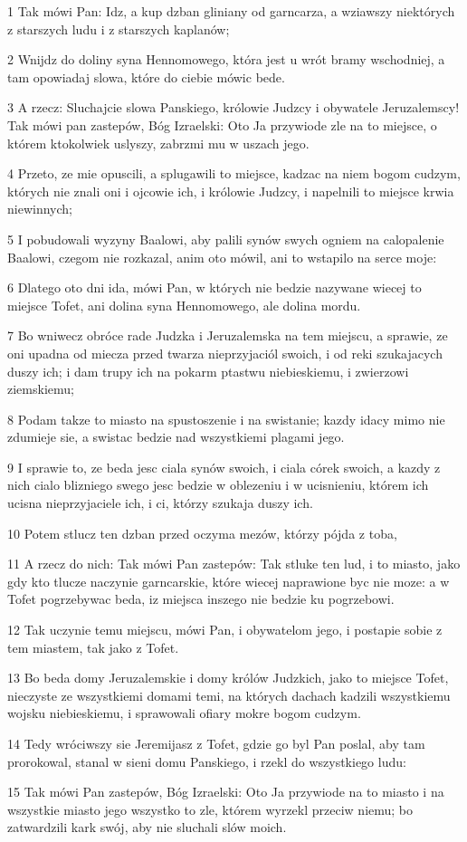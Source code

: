 \par 1 Tak mówi Pan: Idz, a kup dzban gliniany od garncarza, a wziawszy niektórych z starszych ludu i z starszych kaplanów;
\par 2 Wnijdz do doliny syna Hennomowego, która jest u wrót bramy wschodniej, a tam opowiadaj slowa, które do ciebie mówic bede.
\par 3 A rzecz: Sluchajcie slowa Panskiego, królowie Judzcy i obywatele Jeruzalemscy! Tak mówi pan zastepów, Bóg Izraelski: Oto Ja przywiode zle na to miejsce, o którem ktokolwiek uslyszy, zabrzmi mu w uszach jego.
\par 4 Przeto, ze mie opuscili, a splugawili to miejsce, kadzac na niem bogom cudzym, których nie znali oni i ojcowie ich, i królowie Judzcy, i napelnili to miejsce krwia niewinnych;
\par 5 I pobudowali wyzyny Baalowi, aby palili synów swych ogniem na calopalenie Baalowi, czegom nie rozkazal, anim oto mówil, ani to wstapilo na serce moje:
\par 6 Dlatego oto dni ida, mówi Pan, w których nie bedzie nazywane wiecej to miejsce Tofet, ani dolina syna Hennomowego, ale dolina mordu.
\par 7 Bo wniwecz obróce rade Judzka i Jeruzalemska na tem miejscu, a sprawie, ze oni upadna od miecza przed twarza nieprzyjaciól swoich, i od reki szukajacych duszy ich; i dam trupy ich na pokarm ptastwu niebieskiemu, i zwierzowi ziemskiemu;
\par 8 Podam takze to miasto na spustoszenie i na swistanie; kazdy idacy mimo nie zdumieje sie, a swistac bedzie nad wszystkiemi plagami jego.
\par 9 I sprawie to, ze beda jesc ciala synów swoich, i ciala córek swoich, a kazdy z nich cialo blizniego swego jesc bedzie w oblezeniu i w ucisnieniu, którem ich ucisna nieprzyjaciele ich, i ci, którzy szukaja duszy ich.
\par 10 Potem stlucz ten dzban przed oczyma mezów, którzy pójda z toba,
\par 11 A rzecz do nich: Tak mówi Pan zastepów: Tak stluke ten lud, i to miasto, jako gdy kto tlucze naczynie garncarskie, które wiecej naprawione byc nie moze: a w Tofet pogrzebywac beda, iz miejsca inszego nie bedzie ku pogrzebowi.
\par 12 Tak uczynie temu miejscu, mówi Pan, i obywatelom jego, i postapie sobie z tem miastem, tak jako z Tofet.
\par 13 Bo beda domy Jeruzalemskie i domy królów Judzkich, jako to miejsce Tofet, nieczyste ze wszystkiemi domami temi, na których dachach kadzili wszystkiemu wojsku niebieskiemu, i sprawowali ofiary mokre bogom cudzym.
\par 14 Tedy wróciwszy sie Jeremijasz z Tofet, gdzie go byl Pan poslal, aby tam prorokowal, stanal w sieni domu Panskiego, i rzekl do wszystkiego ludu:
\par 15 Tak mówi Pan zastepów, Bóg Izraelski: Oto Ja przywiode na to miasto i na wszystkie miasto jego wszystko to zle, którem wyrzekl przeciw niemu; bo zatwardzili kark swój, aby nie sluchali slów moich.

